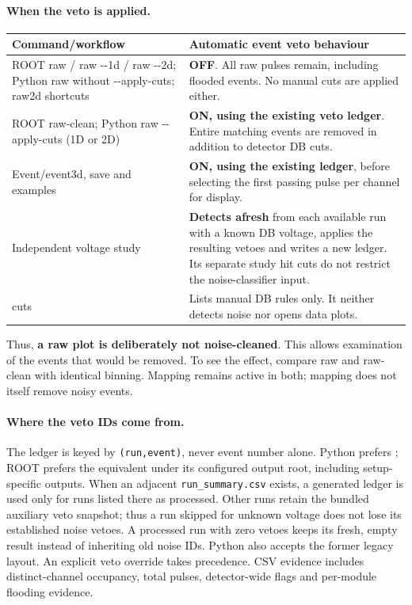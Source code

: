 \documentclass[11pt,a4paper]{article}
\begin{document}
\paragraph{When the veto is applied.}
\begin{longtable}{p{.40\linewidth}p{.50\linewidth}}
\toprule Command/workflow & Automatic event veto behaviour \\\midrule
ROOT raw / raw -{}-1d / raw -{}-2d; Python raw without -{}-apply-cuts; raw2d shortcuts &
\textbf{OFF}. All raw pulses remain, including flooded events. No manual cuts are applied either.\\
ROOT raw-clean; Python raw -{}-apply-cuts (1D or 2D) &
\textbf{ON, using the existing veto ledger}. Entire matching events are removed in addition to detector DB cuts.\\
Event/event3d, save and examples & \textbf{ON, using the existing ledger}, before selecting the first passing pulse per channel for display.\\
Independent voltage study & \textbf{Detects afresh} from each available run with a known DB voltage, applies the resulting vetoes and writes a new ledger. Its separate study hit cuts do not restrict the noise-classifier input.\\
cuts & Lists manual DB rules only. It neither detects noise nor opens data plots.\\
\bottomrule
\end{longtable}
Thus, \textbf{a raw plot is deliberately not noise-cleaned}. This allows examination
of the events that would be removed. To see the effect, compare raw and raw-clean
with identical binning. Mapping remains active in both; mapping does not itself
remove noisy events.

\paragraph{Where the veto IDs come from.}
The ledger is keyed by \texttt{(run,event)}, never event number alone. Python prefers
; ROOT prefers the equivalent under
its configured output root, including setup-specific outputs. When an adjacent
\texttt{run\_summary.csv} exists, a generated ledger is used only for runs listed
there as processed. Other runs retain the bundled auxiliary veto snapshot; thus a
run skipped for unknown voltage does not lose its established noise vetoes.
A processed run with zero vetoes keeps its fresh, empty result instead of inheriting
old noise IDs. Python also accepts the former legacy layout. An explicit veto override takes
precedence. CSV evidence includes distinct-channel occupancy, total pulses,
detector-wide flags and per-module flooding evidence.
\end{document}

